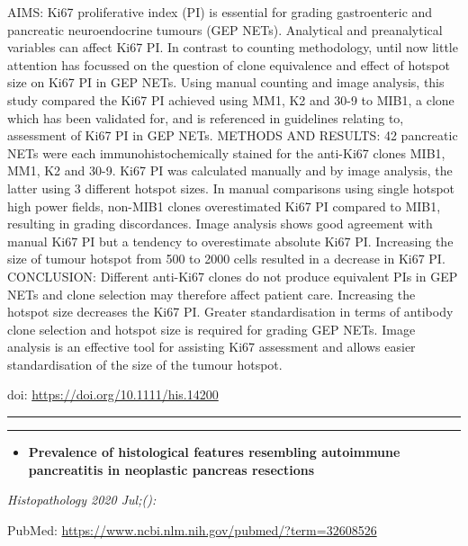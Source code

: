 \documentclass[
]{article}
\providecommand{\tightlist}{%
  \setlength{\itemsep}{0pt}\setlength{\parskip}{0pt}}
\begin{document}
AIMS: Ki67 proliferative index (PI) is essential for grading
gastroenteric and pancreatic neuroendocrine tumours (GEP NETs).
Analytical and preanalytical variables can affect Ki67 PI. In contrast
to counting methodology, until now little attention has focussed on the
question of clone equivalence and effect of hotspot size on Ki67 PI in
GEP NETs. Using manual counting and image analysis, this study compared
the Ki67 PI achieved using MM1, K2 and 30-9 to MIB1, a clone which has
been validated for, and is referenced in guidelines relating to,
assessment of Ki67 PI in GEP NETs. METHODS AND RESULTS: 42 pancreatic
NETs were each immunohistochemically stained for the anti-Ki67 clones
MIB1, MM1, K2 and 30-9. Ki67 PI was calculated manually and by image
analysis, the latter using 3 different hotspot sizes. In manual
comparisons using single hotspot high power fields, non-MIB1 clones
overestimated Ki67 PI compared to MIB1, resulting in grading
discordances. Image analysis shows good agreement with manual Ki67 PI
but a tendency to overestimate absolute Ki67 PI. Increasing the size of
tumour hotspot from 500 to 2000 cells resulted in a decrease in Ki67 PI.
CONCLUSION: Different anti-Ki67 clones do not produce equivalent PIs in
GEP NETs and clone selection may therefore affect patient care.
Increasing the hotspot size decreases the Ki67 PI. Greater
standardisation in terms of antibody clone selection and hotspot size is
required for grading GEP NETs. Image analysis is an effective tool for
assisting Ki67 assessment and allows easier standardisation of the size
of the tumour hotspot.

doi: \url{https://doi.org/10.1111/his.14200}

\begin{center}\rule{0.5\linewidth}{0.5pt}\end{center}

\begin{center}\rule{0.5\linewidth}{0.5pt}\end{center}

\begin{itemize}
\tightlist
\item
  \textbf{Prevalence of histological features resembling autoimmune
  pancreatitis in neoplastic pancreas resections}
\end{itemize}

\emph{Histopathology 2020 Jul;():}

PubMed: \url{https://www.ncbi.nlm.nih.gov/pubmed/?term=32608526}
\end{document}
